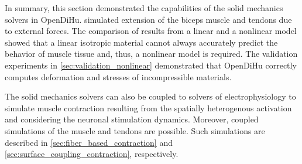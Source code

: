 In summary, this section demonstrated the capabilities of the solid mechanics solvers in OpenDiHu.  simulated extension of the biceps muscle and tendons due to external forces. The comparison of results from a linear and a nonlinear model showed that a linear isotropic material cannot always accurately predict the behavior of muscle tissue and, thus, a nonlinear model is required. The validation experiments in \cref{sec:validation_nonlinear} demonstrated that OpenDiHu correctly computes deformation and stresses of incompressible materials.

The solid mechanics solvers can also be coupled to solvers of electrophysiology to simulate muscle contraction resulting from the spatially heterogenous activation and considering the neuronal stimulation dynamics. Moreover, coupled simulations of the muscle and tendons are possible. Such simulations are described in \cref{sec:fiber_based_contraction} and \cref{sec:surface_coupling_contraction}, respectively.

%


